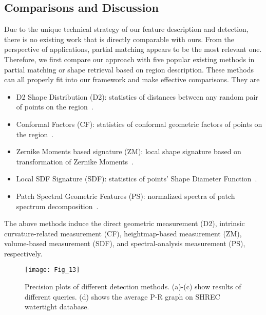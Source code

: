 \subsection{Comparisons and Discussion}
\label{sec:App}

Due to the unique technical strategy of our feature description and
detection, there is no existing work that is directly comparable with
ours. From the perspective of applications, partial matching appears
to be the most relevant one. Therefore, we first compare our approach
with five popular existing methods in partial matching or shape
retrieval based on region description. These methods can all properly
fit into our framework and make effective comparisons. They are
\begin{itemize}
\item D2 Shape Distribution (D2): statistics of distances between any
      random pair of points on the region~\cite{Osada:2002}.
\item Conformal Factors (CF): statistics of conformal geometric factors
      of points on the region~\cite{Ben-Chen:2008}.
\item Zernike Moments based signature (ZM): local shape signature based
      on transformation of Zernike Moments~\cite{Maximo:2011:RRI:2027471}.
\item Local SDF Signature (SDF): statistics of points' Shape Diameter
      Function~\cite{Shapira:2010}.
\item Patch Spectral Geometric Features (PS): normalized spectra of patch
      spectrum decomposition~\cite{Hu2009}.
\end{itemize}
The above methods induce the direct geometric measurement (D2), intrinsic
curvature-related measurement (CF), heightmap-based measurement (ZM),
volume-based measurement (SDF), and spectral-analysis measurement (PS),
respectively.

\begin{figure}[!to]
\texttt{[image: Fig\_13]}
\caption[Precision plots of different detection methods.]
    {Precision plots of different detection methods. (a)-(c) show
    results of different queries. (d) shows the average P-R graph on SHREC
    watertight database.}
\label{PR}
\end{figure}

